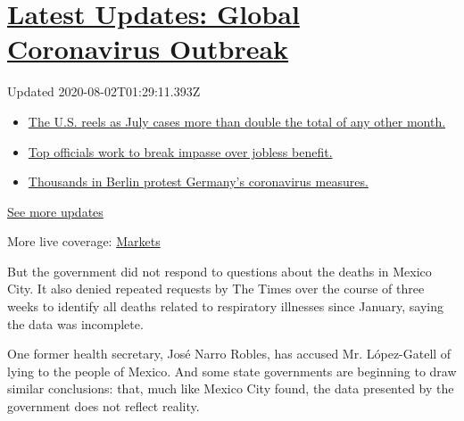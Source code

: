 \hypertarget{latest-updates-global-coronavirus-outbreak}{%
\section{\texorpdfstring{\href{https://www.nytimes.com/2020/08/01/world/coronavirus-covid-19.html?action=click\&pgtype=Article\&state=default\&region=MAIN_CONTENT_1\&context=storylines_live_updates}{Latest
Updates: Global Coronavirus
Outbreak}}{Latest Updates: Global Coronavirus Outbreak}}\label{latest-updates-global-coronavirus-outbreak}}

Updated 2020-08-02T01:29:11.393Z

\begin{itemize}
\tightlist
\item
  \href{https://www.nytimes.com/2020/08/01/world/coronavirus-covid-19.html?action=click\&pgtype=Article\&state=default\&region=MAIN_CONTENT_1\&context=storylines_live_updates\#link-34047410}{The
  U.S. reels as July cases more than double the total of any other
  month.}
\item
  \href{https://www.nytimes.com/2020/08/01/world/coronavirus-covid-19.html?action=click\&pgtype=Article\&state=default\&region=MAIN_CONTENT_1\&context=storylines_live_updates\#link-3ac56579}{Top
  officials work to break impasse over jobless benefit.}
\item
  \href{https://www.nytimes.com/2020/08/01/world/coronavirus-covid-19.html?action=click\&pgtype=Article\&state=default\&region=MAIN_CONTENT_1\&context=storylines_live_updates\#link-25930521}{Thousands
  in Berlin protest Germany's coronavirus measures.}
\end{itemize}

\href{https://www.nytimes.com/2020/08/01/world/coronavirus-covid-19.html?action=click\&pgtype=Article\&state=default\&region=MAIN_CONTENT_1\&context=storylines_live_updates}{See
more updates}

More live coverage:
\href{https://www.nytimes.com/live/2020/07/31/business/stock-market-today-coronavirus?action=click\&pgtype=Article\&state=default\&region=MAIN_CONTENT_1\&context=storylines_live_updates}{Markets}

But the government did not respond to questions about the deaths in
Mexico City. It also denied repeated requests by The Times over the
course of three weeks to identify all deaths related to respiratory
illnesses since January, saying the data was incomplete.

One former health secretary, José Narro Robles, has accused Mr.
López-Gatell of lying to the people of Mexico. And some state
governments are beginning to draw similar conclusions: that, much like
Mexico City found, the data presented by the government does not reflect
reality.

